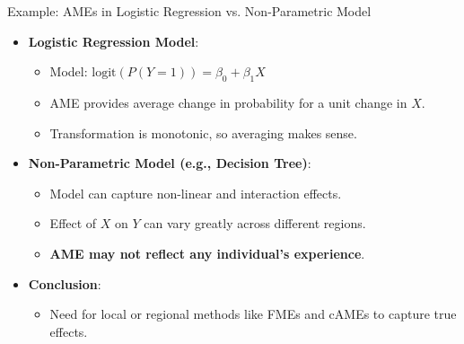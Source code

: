 \documentclass[10pt,compress,t,notes=noshow, xcolor=table]{beamer}
\begin{document}
\begin{frame}{Example: AMEs in Logistic Regression vs. Non-Parametric Model}
\begin{itemize}
\item \textbf{Logistic Regression Model}:
\begin{itemize}
\item Model: $\text{logit}(P(Y=1)) = \beta_0 + \beta_1 X$
\item AME provides average change in probability for a unit change in $X$.
\item Transformation is monotonic, so averaging makes sense.
\end{itemize}
\item \textbf{Non-Parametric Model (e.g., Decision Tree)}:
\begin{itemize}
\item Model can capture non-linear and interaction effects.
\item Effect of $X$ on $Y$ can vary greatly across different regions.
\item \textbf{AME may not reflect any individual's experience}.
\end{itemize}
\item \textbf{Conclusion}:
\begin{itemize}
\item Need for local or regional methods like FMEs and cAMEs to capture true effects.
\end{itemize}
\end{itemize}
\end{frame}
\end{document}

